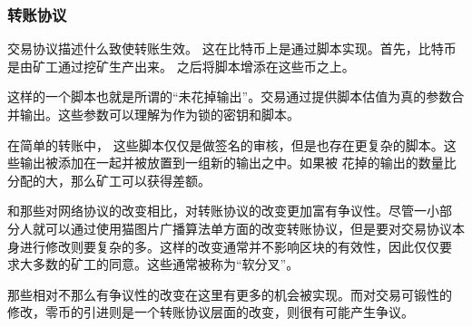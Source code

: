 \documentclass[letterpaper]{article}
\begin{document}
\subsubsection{转账协议}
交易协议描述什么致使转账生效。 这在比特币上是通过脚本实现。首先，比特币是由矿工通过挖矿生产出来。
之后将脚本增添在这些币之上。

这样的一个脚本也就是所谓的``未花掉输出''。交易通过提供脚本估值为真的参数合并输出。这些参数可以理解为作为锁的密钥和脚本。

在简单的转账中， 这些脚本仅仅是做签名的审核，但是也存在更复杂的脚本。这些输出被添加在一起并被放置到一组新的输出之中。如果被
花掉的输出的数量比分配的大，那么矿工可以获得差额。

和那些对网络协议的改变相比，对转账协议的改变更加富有争议性。尽管一小部
分人就可以通过使用猫图片广播算法单方面的改变转账协议，但是要对交易协议本
身进行修改则要复杂的多。这样的改变通常并不影响区块的有效性，因此仅仅要
求大多数的矿工的同意。这些通常被称为``软分叉''。

那些相对不那么有争议性的改变在这里有更多的机会被实现。而对交易可锻性的
修改，零币的引进则是一个转账协议层面的改变，则很有可能产生争议。
\end{document}
